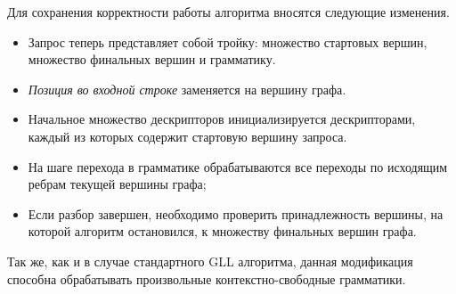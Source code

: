 Для сохранения корректности работы алгоритма вносятся следующие изменения. 

\begin{itemize}
\item Запрос теперь представляет собой тройку: множество стартовых вершин, множество финальных вершин и грамматику.
\item \emph{Позиция во входной строке} заменяется на вершину графа.
\item Начальное множество дескрипторов инициализируется дескрипторами, каждый из которых содержит стартовую вершину запроса.
\item На шаге перехода в грамматике обрабатываются все переходы по исходящим ребрам текущей вершины графа;
\item Если разбор завершен, необходимо проверить принадлежность вершины, на которой алгоритм остановился, к множеству финальных вершин графа.
\end{itemize}

Так же, как и в случае стандартного GLL алгоритма, данная модификация способна обрабатывать произвольные контекстно-свободные грамматики. 